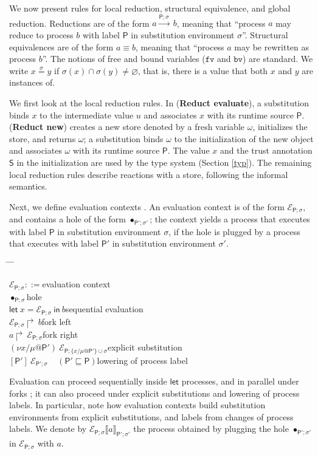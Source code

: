 \documentclass{sigplanconf}
\newenvironment{defn2}{\begin{tabbing}
  \hspace{1.5em} \= \hspace{.295\linewidth - 1.5em} \= \hspace{1.5em} \= \kill
  }{
  \end{tabbing}}
\newcommand{\entry}[2]{\>$#1$\>\>#2}
\newcommand{\clause}[2]{$#1$\>\>#2}
\newcommand{\mycategory}[2]{\clause{#1::=}{#2}}
\newcommand{\labp}{\mathsf P}
\newcommand{\labb}{\mathsf S}
\newcommand{\new}[2]{(\nu #1)\:#2}
\newcommand{\action}[1]{\stackrel{#1}{\longrightarrow}~}
\newcommand{\fv}{\mathtt{fv}}
\newcommand{\bv}{\mathtt{bv}}
\newcommand{\fork}[2]{#1\Rsh\:\!#2}
\newcommand{\eval}[3]{\mathsf{let}~#1=#2~\mathsf{in}~#3}
\newcommand{\sctxr}[2]{\mathcal E_{\labp;\sigma}\llbracket#1\rrbracket_{#2}}
\newcommand{\rrule}[1]{\textbf{Reduct #1}}
\begin{document}
We now present rules for local reduction, structural equivalence, and global reduction.
Reductions are of the form $a
\action{\labp;\sigma} b$, meaning that ``process $a$ 
may reduce to process $b$ with label $\labp$ in
substitution environment $\sigma$''. Structural equivalences are of the form $a \equiv b$, meaning that ``process $a$ may be rewritten as process $b$''.
The notions
of free and bound variables ($\fv$ and $\bv$) are
standard. 
We write $x \stackrel\sigma= y$ if $\sigma(x) \cap \sigma(y) \neq \varnothing$, that is, there is a value that both $x$ and $y$ are instances of.


We first look at the local reduction rules.
In (\rrule{evaluate\-}), a substitution binds $x$ to the intermediate value $u$ and associates $x$ with its
runtime source $\labp$. 
(\rrule{new}) creates a new store denoted by a fresh variable $\omega$, initializes the store, and returns $\omega$; a substitution binds $\omega$ to the initialization of the new object and associates $\omega$ with its runtime source $\labp$. The value $x$ and the trust annotation $\labb$ in the initialization are used by the type system (Section \ref{typ}).
The remaining local reduction rules describe reactions with a store, following the informal semantics.

Next, we define evaluation contexts \cite{evalcontext}. An evaluation context is of the form $\mathcal E_{\labp;\sigma}$, and contains a hole of the form $\bullet_{\labp';\sigma'}$; the context yields a process that executes with label
$\labp$ in substitution environment $\sigma$, if the hole is plugged by a process that executes with label $\labp'$ in substitution environment $\sigma'$.
\begin{defn2}
\mycategory{\mathcal E_{\labp;\sigma}}{evaluation context} \\
\entry{\bullet_{\labp;\sigma}}{hole} \\
\entry{\eval x {\mathcal E_{\labp;\sigma}} b}{sequential evaluation} \\
\entry{\fork{\mathcal E_{\labp;\sigma}} b}{fork left} \\
\entry{\fork a \mathcal E_{\labp;\sigma}}{fork right} \\
\entry{\new {x/\mu @\labp'} \mathcal E_{\labp;\{x/\mu@\labp'\}\cup \sigma}}{explicit substitution} \\
\entry{[\labp']~\mathcal E_{\labp';\sigma}~~~~~(\labp' \sqsubseteq \labp)}{lowering of process label}
\end{defn2}
Evaluation can proceed sequentially inside $\mathsf{let}$ processes, and in parallel under forks \cite{gordon98concurrent}; it can also proceed under
explicit substitutions and lowering of process labels. 
In particular, note how evaluation contexts build substitution environments from explicit substitutions, and labels from changes of process labels. 
We denote by $\sctxr a {\labp';\sigma'}$ the process obtained by plugging the
hole $\bullet_{\labp';\sigma'}$ in $\mathcal E_{\labp;\sigma}$ with $a$. 
\end{document}
